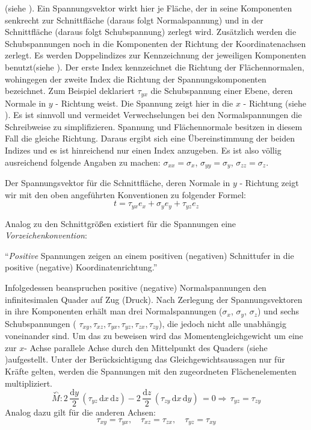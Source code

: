 \documentclass[12pt,a4paper,parskip,twoside,BCOR5mm,headsepline]{scrartcl}
\begin{document}
\begin{description*}
  
  (siehe ). Ein Spannungsvektor wirkt hier je Fläche, der in seine Komponenten senkrecht zur Schnittfläche (daraus folgt Normalspannung) und in der Schnittfläche (daraus folgt Schubspannung) zerlegt wird. Zusätzlich werden die Schubspannungen noch in die Komponenten der Richtung der Koordinatenachsen zerlegt. Es werden Doppelindizes zur Kennzeichnung der jeweiligen Komponenten benutzt(siehe ). 
Der erste Index kennzeichnet die Richtung der Flächennormalen, wohingegen der zweite Index die Richtung der Spannungskomponenten bezeichnet. Zum Beispiel deklariert $ \tau_{yx} $ die Schubspannung einer Ebene, deren Normale in $y$ - Richtung weist. Die Spannung zeigt hier in die $ x $ - Richtung (siehe ). Es ist sinnvoll und vermeidet Verwechselungen bei den Normalspannungen die Schreibweise zu simplifizieren. Spannung und Flächennormale besitzen in diesem Fall die gleiche Richtung. Daraus ergibt sich eine Übereinstimmung der beiden Indizes und es ist hinreichend nur einen Index anzugeben. Es ist also völlig ausreichend  folgende Angaben zu machen: $ \sigma_{xx} = \sigma_{x} $, $ \sigma_{yy} = \sigma_y $, $ \sigma_{zz} = \sigma_z $.

Der Spannungsvektor für die Schnittfläche, deren Normale in $ y $ - Richtung zeigt wir mit den oben angeführten Konventionen zu folgender Formel:
\begin{equation}
t = \tau_{yx}e_x + \sigma_ye_y + \tau_{yz}e_z
\end{equation}

Analog zu den Schnittgrößen existiert für die Spannungen eine \emph{Vorzeichenkonvention}:

"`\emph{Positive} Spannungen zeigen an einem positiven (negativen) Schnittufer in die positive (negative) Koordinatenrichtung."' \autocite[45]{tmr}

Infolgedessen beanspruchen positive (negative) Normalspannungen den infinitesimalen Quader auf Zug (Druck). Nach Zerlegung der Spannungsvektoren in ihre Komponenten erhält man drei Normalspannungen ($ \sigma_x$, $ \sigma_y $, $ \sigma_z $) und sechs Schubspannungen ( $ \tau_{xy}, \tau_{xz}, \tau_{yx}, \tau_{yz}, \tau_{zx}, \tau_{zy} $), die jedoch nicht alle unabhängig voneinander sind. Um das zu beweisen wird das Momentengleichgewicht um eine zur $x$- Achse parallele Achse durch den Mittelpunkt des Quaders (siehe )aufgestellt. Unter der Berücksichtigung das Gleichgewichtsaussagen nur für Kräfte gelten, werden die Spannungen mit den zugeordneten Flächenelementen multipliziert.
\begin{equation}
\overset{\curvearrowleft}{M}: 2\,\frac{\text{d}y}{2}\,(\tau_{yz}\,\text{d}x\,\text{d}z) - 2\,\frac{\text{d}z}{2}\,(\tau_{zy}\, \text{d}x\,\text{d}y)\,= 0 \Rightarrow\,\tau_{yz} = \tau_{zy}
\end{equation} Analog dazu gilt für die anderen Achsen: \begin{equation}
\tau_{xy}=\tau_{yx},\quad\tau_{xz}=\tau_{zx},\quad\tau_{yz}=\tau_{xy}
\end{equation}


\end{description*}
\end{document}
